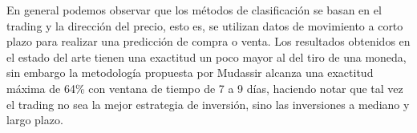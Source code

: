 En general podemos observar que los métodos de clasificación se basan en el trading y la dirección del precio, esto es, se utilizan datos de movimiento a corto plazo para realizar una predicción de compra o venta. Los resultados obtenidos en el estado del arte  tienen una exactitud un poco mayor al del tiro de una moneda, sin embargo la metodología propuesta por Mudassir \cite{mudassirTimeseriesForecastingBitcoin2020} alcanza una exactitud máxima de 64\% con ventana de tiempo de 7 a 9 días, haciendo notar que tal vez el trading no sea la mejor estrategia de inversión, sino las inversiones a mediano y largo plazo.
